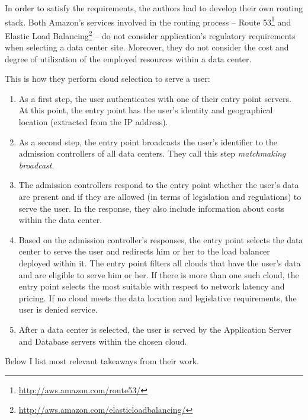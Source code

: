 \documentclass{uvamscse}
\begin{document}
In order to satisfy the requirements, the authors had to develop their own routing stack. Both Amazon's services involved in the routing process -- Route 53\footnote{\url{http://aws.amazon.com/route53/}} and Elastic Load Balancing\footnote{\url{http://aws.amazon.com/elasticloadbalancing/}} -- do not consider application's regulatory requirements when selecting a data center site. Moreover, they do not consider the cost and degree of utilization of the employed resources within a data center.

This is how they perform cloud selection to serve a user:
\begin{enumerate}
  \item As a first step, the user authenticates with one of their entry point servers. At this point, the entry point has the user’s identity and geographical location (extracted from the IP address).
  \item As a second step, the entry point broadcasts the user’s identifier to the admission controllers of all data centers. They call this step \textit{matchmaking broadcast}.
  \item The admission controllers respond to the entry point whether the user’s data are present and if they are allowed (in terms of legislation and regulations) to serve the user. In the response, they also include information about costs within the data center.
  \item Based on the admission controller's responses, the entry point selects the data center to serve the user and redirects him or her to the load balancer deployed within it. The entry point filters all clouds that have the user’s data and are eligible to serve him or her. If there is more than one such cloud, the entry point selects the most suitable with respect to network latency and pricing. If no cloud meets the data location and legislative requirements, the user is denied service.
  \item After a data center is selected, the user is served by the Application Server and Database servers within the chosen cloud.
\end{enumerate}

Below I list most relevant takeaways from their work.
\end{document}
